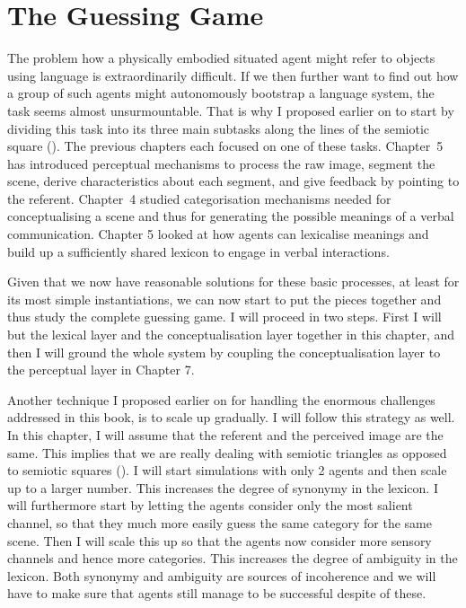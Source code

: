 \chapter{The Guessing Game} \label{chap:6}

The problem how a physically embodied situated agent
might refer to objects using language is extraordinarily 
difficult. If we then further want to find out how 
a group of such agents might autonomously bootstrap
a language system, the task seems almost unsurmountable. 
That is why I proposed earlier on to start by dividing
this task into its three main subtasks along the lines
of the semiotic square ().
The previous chapters each focused on one of these tasks. 
Chapter~5 has introduced 
perceptual mechanisms to process the raw image, segment
the scene, derive characteristics about each 
segment, and give feedback by pointing to the referent. 
Chapter~4 studied categorisation mechanisms
needed for conceptualising a scene and thus for 
generating the possible meanings of a verbal
communication. Chapter 5 looked at how agents can 
lexicalise meanings and build up a sufficiently shared
lexicon to engage in verbal interactions. 

Given that we now have reasonable solutions for these
basic processes, at least for its most simple instantiations, 
we can now start to put the pieces together and thus
study the complete guessing game. I will 
proceed in two steps. First I will but the lexical 
layer and the conceptualisation layer together in 
this chapter, and then I will ground the whole system 
by coupling the conceptualisation layer to the 
perceptual layer in Chapter 7. 

Another technique I proposed earlier on 
for handling the enormous challenges addressed in 
this book, is to scale up 
gradually. I will follow this strategy as well. In this
chapter, I will assume that the referent and the 
perceived image are the same. This implies that we 
are really dealing with semiotic triangles as 
opposed to semiotic squares (). 
I will start simulations with only 2 agents and then 
scale up to a larger number. This increases the degree
of synonymy in the lexicon. I will furthermore
start by letting the agents 
consider only the most salient channel, so that 
they much more easily guess the same category for the 
same scene. Then I will scale this up so that 
the agents now consider more sensory channels and hence
more categories. This increases the degree of 
ambiguity in the lexicon. Both synonymy and ambiguity 
are sources of incoherence and we will have to make
sure that agents still manage to be successful 
despite of these. 

